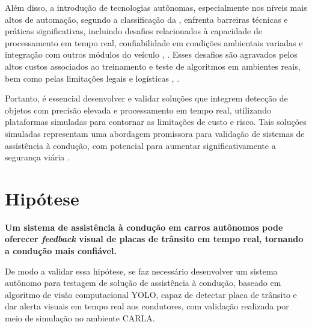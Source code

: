 \documentclass[
	12pt,				%
	oneside, %
	a4paper,			%
	english,			%
	french,				%
	spanish,			%
	brazil				%
	]{abntex2}
\begin{document}
Além disso, a introdução de tecnologias autônomas, especialmente nos níveis mais altos de automação, segundo a classificação da , enfrenta barreiras técnicas e práticas significativas, incluindo desafios relacionados à capacidade de processamento em tempo real, confiabilidade em condições ambientais variadas e integração com outros módulos do veículo \cite{dosovitskiy2017carla}, \cite{wachenfeld_release_autonomous_vehicles}. Esses desafios são agravados pelos altos custos associados ao treinamento e teste de algoritmos em ambientes reais, bem como pelas limitações legais e logísticas \cite{dosovitskiy2017carla}, \cite{ahire2024simulating}.

Portanto, é essencial desenvolver e validar soluções que integrem detecção de objetos com precisão elevada e processamento em tempo real, utilizando plataformas simuladas para contornar as limitações de custo e risco. Tais soluções simuladas representam uma abordagem promissora para validação de sistemas de assistência à condução, com potencial para aumentar significativamente a segurança viária \cite{janai_computer_vision_av, sensors-yet}.

\section{Hipótese} \label{hipotese}

\textbf{Um sistema de assistência à condução em carros autônomos pode oferecer \textit{feedback} visual de placas de trânsito em tempo real, tornando a condução mais confiável.} 

De modo a validar essa hipótese, se faz necessário desenvolver um sistema autônomo para testagem de solução de assistência à condução, baseado em algoritmo de visão computacional YOLO, capaz de detectar placa de trânsito e dar alerta visuais em tempo real aos condutores, com validação realizada por meio de simulação no ambiente CARLA.
\\
% 


\end{document}
